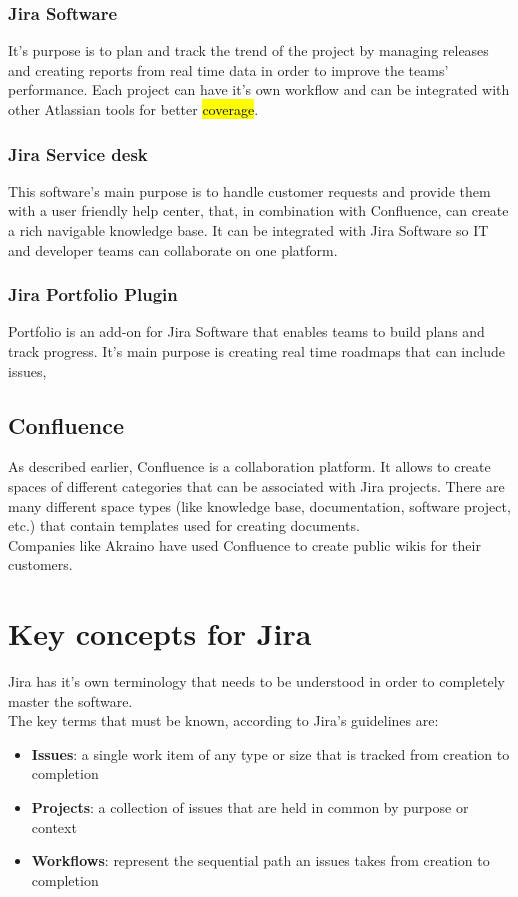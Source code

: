 		\subsubsection{Jira Software}
			It's purpose is to plan and track the trend of the project by managing releases and creating reports from real time data in order to improve the teams' performance.
			Each project can have it's own workflow and can be integrated with other Atlassian tools for better \hl{coverage}.
		
		\subsubsection{Jira Service desk}
			This software's main purpose is to handle customer requests and provide them with a user friendly help center, that, in combination with Confluence, can create a rich navigable knowledge base.
			It can be integrated with Jira Software so IT and developer teams can collaborate on one platform.

		\subsubsection{Jira Portfolio Plugin}
			Portfolio is an add-on for Jira Software that enables teams to build plans and track progress.
			It's main purpose is creating real time roadmaps that can include issues, 
		
	\subsection{Confluence}
		As described earlier, Confluence is a collaboration platform.
		It allows to create spaces of different categories that can be associated with Jira projects.
		There are many different space types (like knowledge base, documentation, software project, etc.) that contain templates used for creating documents.\\
		Companies like Akraino have used Confluence to create public wikis for their customers\cite{akraino}.
		
\section{Key concepts for Jira}
	Jira has it's own terminology that needs to be understood in order to completely master the software.\\
	The key terms that must be known, according to Jira's guidelines\cite{key-terms-to-know} are:
	\begin{itemize}
		\item \textbf{Issues}: a single work item of any type or size that is tracked from creation to completion
		\item \textbf{Projects}: a collection of issues that are held in common by purpose or context
		\item \textbf{Workflows}: represent the sequential path an issues takes from creation to completion
	\end{itemize}
	

